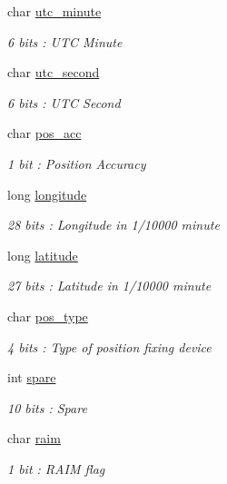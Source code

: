\begin{DoxyCompactItemize}
char \mbox{\hyperlink{structaismsg__4_a6d66f74ac0ce1ea875df08d9defd3ebb}{utc\+\_\+minute}}
\begin{DoxyCompactList}\small\item\em 6 bits \+: U\+TC Minute \end{DoxyCompactList}\item 
char \mbox{\hyperlink{structaismsg__4_ab89f40bd8f6ab20b0af5c797ffe7d13c}{utc\+\_\+second}}
\begin{DoxyCompactList}\small\item\em 6 bits \+: U\+TC Second \end{DoxyCompactList}\item 
char \mbox{\hyperlink{structaismsg__4_a32241b33bc1b162dc4c3c5b8e658d633}{pos\+\_\+acc}}
\begin{DoxyCompactList}\small\item\em 1 bit \+: Position Accuracy \end{DoxyCompactList}\item 
long \mbox{\hyperlink{structaismsg__4_a904297794e0662968ec742eeb794a701}{longitude}}
\begin{DoxyCompactList}\small\item\em 28 bits \+: Longitude in 1/10000 minute \end{DoxyCompactList}\item 
long \mbox{\hyperlink{structaismsg__4_a911867f9c6e400613305ff3a17ed0fe7}{latitude}}
\begin{DoxyCompactList}\small\item\em 27 bits \+: Latitude in 1/10000 minute \end{DoxyCompactList}\item 
char \mbox{\hyperlink{structaismsg__4_a3d307c76e8cd34bbdda13ae39bf59792}{pos\+\_\+type}}
\begin{DoxyCompactList}\small\item\em 4 bits \+: Type of position fixing device \end{DoxyCompactList}\item 
int \mbox{\hyperlink{structaismsg__4_a640be58ad8b780ead7d98c3be329c6ed}{spare}}
\begin{DoxyCompactList}\small\item\em 10 bits \+: Spare \end{DoxyCompactList}\item 
char \mbox{\hyperlink{structaismsg__4_a9cffeb466e40c4376000398e208ab076}{raim}}
\begin{DoxyCompactList}\small\item\em 1 bit \+: R\+A\+IM flag \end{DoxyCompactList}\item 

\end{DoxyCompactItemize}
